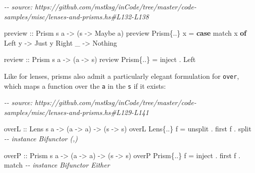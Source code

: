 \documentclass[]{article}
\newenvironment{Shaded}{}{}
\newcommand{\CommentTok}[1]{\textcolor[rgb]{0.38,0.63,0.69}{\textit{#1}}}
\newcommand{\DataTypeTok}[1]{\textcolor[rgb]{0.56,0.13,0.00}{#1}}
\newcommand{\KeywordTok}[1]{\textcolor[rgb]{0.00,0.44,0.13}{\textbf{#1}}}
\newcommand{\NormalTok}[1]{#1}
\newcommand{\OperatorTok}[1]{\textcolor[rgb]{0.40,0.40,0.40}{#1}}
\newcommand{\OtherTok}[1]{\textcolor[rgb]{0.00,0.44,0.13}{#1}}
\begin{document}
\begin{Shaded}
\begin{Highlighting}[]
\CommentTok{{-}{-} source: https://github.com/mstksg/inCode/tree/master/code{-}samples/misc/lenses{-}and{-}prisms.hs\#L132{-}L138}

\OtherTok{preview ::} \DataTypeTok{Prism\textquotesingle{}}\NormalTok{ s a }\OtherTok{{-}>}\NormalTok{ (s }\OtherTok{{-}>} \DataTypeTok{Maybe}\NormalTok{ a)}
\NormalTok{preview }\DataTypeTok{Prism\textquotesingle{}}\NormalTok{\{}\OperatorTok{..}\NormalTok{\} x }\OtherTok{=} \KeywordTok{case}\NormalTok{ match x }\KeywordTok{of}
    \DataTypeTok{Left}\NormalTok{  y }\OtherTok{{-}>} \DataTypeTok{Just}\NormalTok{ y}
    \DataTypeTok{Right}\NormalTok{ \_ }\OtherTok{{-}>} \DataTypeTok{Nothing}

\OtherTok{review  ::} \DataTypeTok{Prism\textquotesingle{}}\NormalTok{ s a }\OtherTok{{-}>}\NormalTok{ (a }\OtherTok{{-}>}\NormalTok{ s)}
\NormalTok{review }\DataTypeTok{Prism\textquotesingle{}}\NormalTok{\{}\OperatorTok{..}\NormalTok{\} }\OtherTok{=}\NormalTok{ inject }\OperatorTok{.} \DataTypeTok{Left}
\end{Highlighting}
\end{Shaded}

Like for lenses, prisms also admit a particularly elegant formulation for
\texttt{over}, which maps a function over the \texttt{a} in the \texttt{s} if it
exists:

\begin{Shaded}
\begin{Highlighting}[]
\CommentTok{{-}{-} source: https://github.com/mstksg/inCode/tree/master/code{-}samples/misc/lenses{-}and{-}prisms.hs\#L129{-}L141}

\OtherTok{overL ::} \DataTypeTok{Lens\textquotesingle{}}\NormalTok{ s a }\OtherTok{{-}>}\NormalTok{ (a }\OtherTok{{-}>}\NormalTok{ a) }\OtherTok{{-}>}\NormalTok{ (s }\OtherTok{{-}>}\NormalTok{ s)}
\NormalTok{overL }\DataTypeTok{Lens\textquotesingle{}}\NormalTok{\{}\OperatorTok{..}\NormalTok{\}  f }\OtherTok{=}\NormalTok{ unsplit }\OperatorTok{.}\NormalTok{ first f }\OperatorTok{.}\NormalTok{ split   }\CommentTok{{-}{-} instance Bifunctor (,)}

\OtherTok{overP ::} \DataTypeTok{Prism\textquotesingle{}}\NormalTok{ s a }\OtherTok{{-}>}\NormalTok{ (a }\OtherTok{{-}>}\NormalTok{ a) }\OtherTok{{-}>}\NormalTok{ (s }\OtherTok{{-}>}\NormalTok{ s)}
\NormalTok{overP }\DataTypeTok{Prism\textquotesingle{}}\NormalTok{\{}\OperatorTok{..}\NormalTok{\} f }\OtherTok{=}\NormalTok{ inject }\OperatorTok{.}\NormalTok{ first f }\OperatorTok{.}\NormalTok{ match    }\CommentTok{{-}{-} instance Bifunctor Either}
\end{Highlighting}
\end{Shaded}
\end{document}
